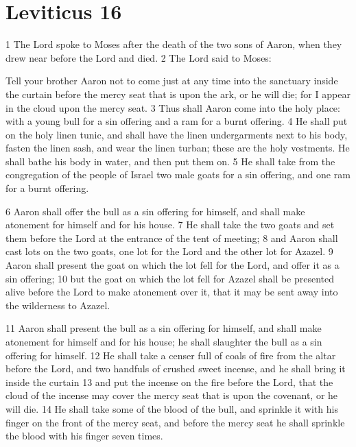 \chapter{Leviticus 16}
\label{ch:lev16}

1 The Lord spoke to Moses after the death of the two sons of Aaron, when they drew
near before the Lord and died. 2 The Lord said to Moses:

Tell your brother Aaron not to come just at any time into the sanctuary inside 
the curtain before the mercy seat that is upon the ark, or he will die; for 
I appear in the cloud upon the mercy seat. 3 Thus shall Aaron come into the 
holy place: with a young bull for a sin offering and a ram for a burnt offering. 
4 He shall put on the holy linen tunic, and shall have the linen undergarments 
next to his body, fasten the linen sash, and wear the linen turban; these are 
the holy vestments. He shall bathe his body in water, and then put them on. 
5 He shall take from the congregation of the people of Israel two male goats for
a sin offering, and one ram for a burnt offering.

6 Aaron shall offer the bull as a sin offering for himself, and shall make 
atonement for himself and for his house. 7 He shall take the two goats and 
set them before the Lord at the entrance of the tent of meeting; 8 and Aaron 
shall cast lots on the two goats, one lot for the Lord and the other lot for 
Azazel. 9 Aaron shall present the goat on which the lot fell for the Lord, 
and offer it as a sin offering; 10 but the goat on which the lot fell for 
Azazel shall be presented alive before the Lord to make atonement over it, 
that it may be sent away into the wilderness to Azazel.

11 Aaron shall present the bull as a sin offering for himself, and shall make 
atonement for himself and for his house; he shall slaughter the bull as a sin 
offering for himself. 12 He shall take a censer full of coals of fire from the 
altar before the Lord, and two handfuls of crushed sweet incense, and he shall 
bring it inside the curtain 13 and put the incense on the fire before the Lord, 
that the cloud of the incense may cover the mercy seat that is upon the 
covenant, or he will die. 14 He shall take some of the blood of the bull, and 
sprinkle it with his finger on the front of the mercy seat, and before the 
mercy seat he shall sprinkle the blood with his finger seven times.

